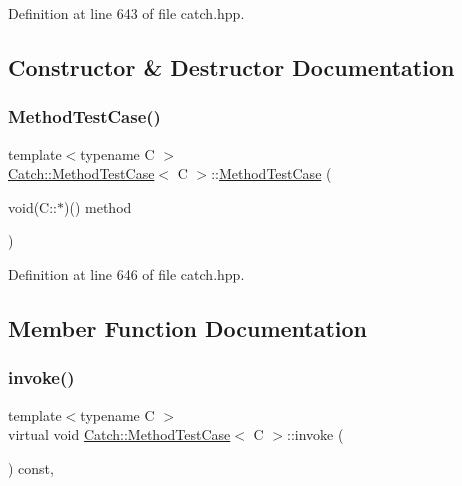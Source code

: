 Definition at line 643 of file catch.\+hpp.



\subsection{Constructor \& Destructor Documentation}
\hypertarget{class_catch_1_1_method_test_case_a7b043b85dae371358255dd9dc6582e7b}{}\label{class_catch_1_1_method_test_case_a7b043b85dae371358255dd9dc6582e7b} 
\subsubsection{\texorpdfstring{Method\+Test\+Case()}{MethodTestCase()}}
{\footnotesize\ttfamily template$<$typename C $>$ \\
\hyperlink{class_catch_1_1_method_test_case}{Catch\+::\+Method\+Test\+Case}$<$ C $>$\+::\hyperlink{class_catch_1_1_method_test_case}{Method\+Test\+Case} (\begin{DoxyParamCaption}\item[{void(C\+::$\ast$)()}]{method }\end{DoxyParamCaption})\hspace{0.3cm}{\ttfamily [inline]}}



Definition at line 646 of file catch.\+hpp.



\subsection{Member Function Documentation}
\hypertarget{class_catch_1_1_method_test_case_a4e2263cfa0646f2980768328cb372793}{}\label{class_catch_1_1_method_test_case_a4e2263cfa0646f2980768328cb372793} 
\subsubsection{\texorpdfstring{invoke()}{invoke()}}
{\footnotesize\ttfamily template$<$typename C $>$ \\
virtual void \hyperlink{class_catch_1_1_method_test_case}{Catch\+::\+Method\+Test\+Case}$<$ C $>$\+::invoke (\begin{DoxyParamCaption}{ }\end{DoxyParamCaption}) const\hspace{0.3cm}{\ttfamily [inline]}, {\ttfamily [virtual]}}



